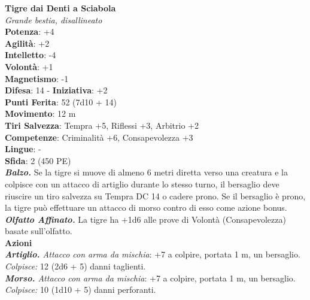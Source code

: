 \begin{multicols}{2}
\medskip\textbf{Tigre dai Denti a Sciabola}\\
\emph{Grande bestia, disallineato}\\
\textbf{Potenza}: +4\\
\textbf{Agilità}: +2\\
\textbf{Intelletto}: -4\\
\textbf{Volontà}: +1\\
\textbf{Magnetismo}: -1\\
\textbf{Difesa}: 14 - \textbf{Iniziativa}: +2\\
\textbf{Punti Ferita}: 52 (7d10 + 14)\\
\textbf{Movimento}: 12 m\\
\textbf{Tiri Salvezza}: Tempra +5, Riflessi +3, Arbitrio +2\\
\textbf{Competenze}: Criminalità +6, Consapevolezza +3\\
\textbf{Lingue}: -\\
\textbf{Sfida}: 2 (450 PE)\smallskip\\
\emph{\textbf{Balzo.}} Se la tigre si muove di almeno 6 metri diretta verso una creatura e la colpisce con un attacco di artiglio durante lo stesso turno, il bersaglio deve riuscire un tiro salvezza su Tempra DC 14 o cadere prono. Se il bersaglio è prono, la tigre può effettuare un attacco di morso contro di esso come azione bonus.\\
\emph{\textbf{Olfatto Affinato.}} La tigre ha +1d6 alle prove di Volontà (Consapevolezza) basate sull'olfatto.\\
\smallskip\textbf{Azioni}\\
\emph{\textbf{Artiglio.} Attacco con arma da mischia}: +7 a colpire, portata 1 m, un bersaglio.\\
\emph{Colpisce:} 12 (2d6 + 5) danni taglienti.\\
\emph{\textbf{Morso.} Attacco con arma da mischia}: +7 a colpire, portata 1 m, un bersaglio.\\
\emph{Colpisce:} 10 (1d10 + 5) danni perforanti.\\


\end{multicols}
